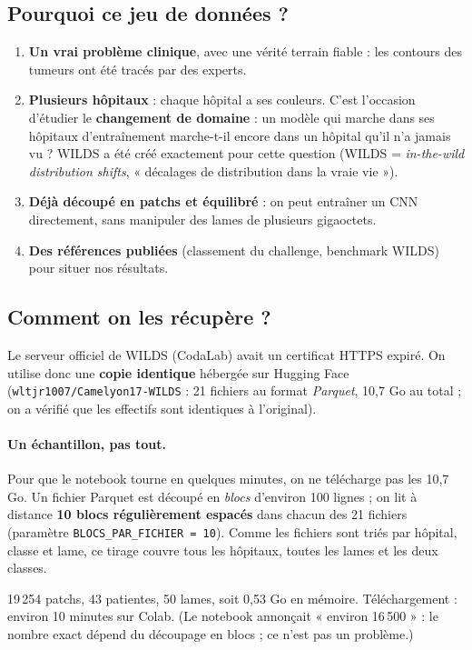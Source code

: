 \documentclass[11pt,a4paper]{article}
\begin{document}
\subsection{Pourquoi ce jeu de données ?}
\begin{enumerate}
  \item \textbf{Un vrai problème clinique}, avec une vérité terrain fiable : les contours des tumeurs ont été
        tracés par des experts.
  \item \textbf{Plusieurs hôpitaux} : chaque hôpital a ses couleurs. C'est l'occasion d'étudier le
        \textbf{changement de domaine} : un modèle qui marche dans ses hôpitaux d'entraînement marche-t-il
        encore dans un hôpital qu'il n'a jamais vu ? WILDS a été créé exactement pour cette question
        (WILDS = \emph{in-the-wild distribution shifts}, « décalages de distribution dans la vraie vie »).
  \item \textbf{Déjà découpé en patchs et équilibré} : on peut entraîner un CNN directement, sans manipuler
        des lames de plusieurs gigaoctets.
  \item \textbf{Des références publiées} (classement du challenge, benchmark WILDS) pour situer nos résultats.
\end{enumerate}

\subsection{Comment on les récupère ?}
Le serveur officiel de WILDS (CodaLab) avait un certificat HTTPS expiré. On utilise donc une
\textbf{copie identique} hébergée sur Hugging Face (\texttt{wltjr1007/Camelyon17-WILDS} : 21 fichiers au
format \emph{Parquet}, 10,7 Go au total ; on a vérifié que les effectifs sont identiques à l'original).

\paragraph{Un échantillon, pas tout.} Pour que le notebook tourne en quelques minutes, on ne télécharge pas les
10,7 Go. Un fichier Parquet est découpé en \emph{blocs} d'environ 100 lignes ; on lit à distance
\textbf{10 blocs régulièrement espacés} dans chacun des 21 fichiers (paramètre \texttt{BLOCS\_PAR\_FICHIER = 10}).
Comme les fichiers sont triés par hôpital, classe et lame, ce tirage couvre tous les hôpitaux, toutes les
lames et les deux classes.

\begin{constat}[Ce qu'on a obtenu]
19\,254 patchs, 43 patientes, 50 lames, soit 0,53 Go en mémoire. Téléchargement : environ 10 minutes sur Colab.
(Le notebook annonçait « environ 16\,500 » : le nombre exact dépend du découpage en blocs ; ce n'est pas un
problème.)
\end{constat}
\end{document}
